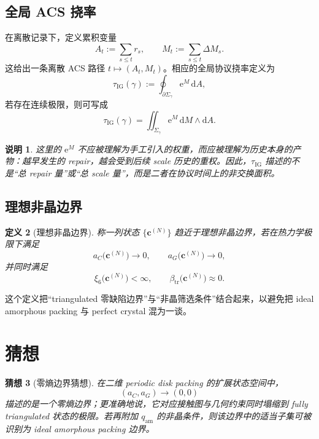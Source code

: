 \documentclass[12pt]{ctexart}
\newtheorem{definition}{定义}[section]
\newtheorem{conjecture}[definition]{猜想}
\newtheorem{remark}[definition]{说明}
\newcommand{\IG}{\mathrm{IG}}
\newcommand{\dd}{\mathrm{d}}
\newcommand{\ee}{\mathrm{e}}
\newcommand{\tr}{\mathrm{tr}}
\begin{document}
\subsection{全局 ACS 挠率}

在离散记录下，定义累积变量
\begin{equation}
A_t := \sum_{s\le t} r_s,
\qquad
M_t := \sum_{s\le t} \Delta M_s.
\end{equation}
这给出一条离散 ACS 路径 $t\mapsto (A_t,M_t)$。相应的全局协议挠率定义为
\begin{equation}
\tau_{\IG}(\gamma) := \oint_{\partial\Sigma_\gamma} \ee^M\,\dd A,
\end{equation}
若存在连续极限，则可写成
\begin{equation}
\tau_{\IG}(\gamma)
= \iint_{\Sigma_\gamma} \ee^M\,\dd M\wedge\dd A.
\end{equation}

\begin{remark}
这里的 $\ee^M$ 不应被理解为手工引入的权重，而应被理解为历史本身的产物：越早发生的 repair，越会受到后续 scale 历史的重权。因此，$\tau_{\IG}$ 描述的不是“总 repair 量”或“总 scale 量”，而是二者在协议时间上的非交换面积。
\end{remark}

\subsection{理想非晶边界}

\begin{definition}[理想非晶边界]
称一列状态 $\{\mathbf{c}^{(N)}\}$ 趋近于理想非晶边界，若在热力学极限下满足
\begin{equation}
 a_C\bigl(\mathbf{c}^{(N)}\bigr)\to 0,
 \qquad
 a_G\bigl(\mathbf{c}^{(N)}\bigr)\to 0,
\end{equation}
并同时满足
\begin{equation}
 \xi_6\bigl(\mathbf{c}^{(N)}\bigr) < \infty,
 \qquad
 \beta_{\tr}\bigl(\mathbf{c}^{(N)}\bigr) \approx 0.
\end{equation}
\end{definition}

这个定义把“triangulated 零缺陷边界”与“非晶筛选条件”结合起来，以避免把 ideal amorphous packing 与 perfect crystal 混为一谈。

\section{猜想}

\begin{conjecture}[零熵边界猜想]
在二维 periodic disk packing 的扩展状态空间中，
\begin{equation}
(a_C,a_G)\to(0,0)
\end{equation}
描述的是一个零熵边界；更准确地说，它对应接触图与几何约束同时塌缩到 fully triangulated 状态的极限。若再附加 $q_{\mathrm{am}}$ 的非晶条件，则该边界中的适当子集可被识别为 ideal amorphous packing 边界。
\end{conjecture}
\end{document}
